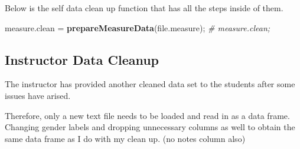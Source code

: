 \documentclass[]{article}
\newenvironment{Shaded}{\begin{snugshade}}{\end{snugshade}}
\newcommand{\CommentTok}[1]{\textcolor[rgb]{0.56,0.35,0.01}{\textit{#1}}}
\newcommand{\DecValTok}[1]{\textcolor[rgb]{0.00,0.00,0.81}{#1}}
\newcommand{\KeywordTok}[1]{\textcolor[rgb]{0.13,0.29,0.53}{\textbf{#1}}}
\newcommand{\NormalTok}[1]{#1}
\newcommand{\OperatorTok}[1]{\textcolor[rgb]{0.81,0.36,0.00}{\textbf{#1}}}
\newcommand{\OtherTok}[1]{\textcolor[rgb]{0.56,0.35,0.01}{#1}}
\newcommand{\StringTok}[1]{\textcolor[rgb]{0.31,0.60,0.02}{#1}}
\begin{document}
Below is the self data clean up function that has all the steps inside
of them.

\begin{Shaded}
\begin{Highlighting}[]
\NormalTok{measure.clean =}\StringTok{ }\KeywordTok{prepareMeasureData}\NormalTok{(file.measure);}
\CommentTok{\# measure.clean;}
\end{Highlighting}
\end{Shaded}

\newpage

\subsection{Instructor Data Cleanup}
\label{sec:appendix-instructor-data-cleanup}

The instructor has provided another cleaned data set to the students
after some issues have arised.

Therefore, only a new text file needs to be loaded and read in as a data
frame. Changing gender labels and dropping unnecessary columns as well
to obtain the same data frame as I do with my clean up. (no notes column
also)

\begin{Shaded}
\end{Shaded}
\end{document}
